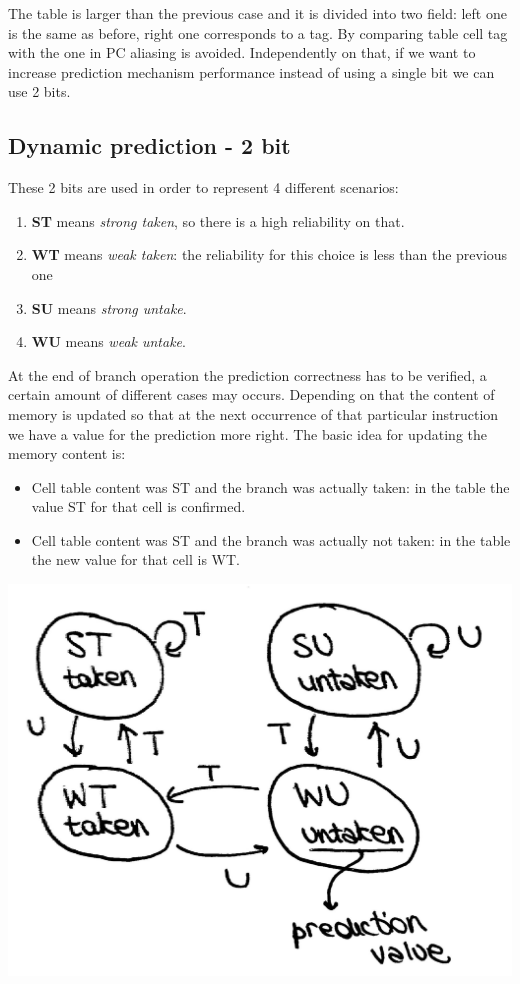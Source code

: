 The table is larger than the previous case and it is divided into two field:
left one is the same as before, right one corresponds to a tag. By comparing
table cell tag with the one in PC aliasing is avoided.
Independently on that, if we want to increase prediction mechanism performance
instead of using a single bit we can use 2 bits.


\subsection{Dynamic prediction - 2 bit}
These 2 bits are used in order to represent 4 different scenarios:

\begin{enumerate}
  \item \textbf{ST} means \textit{strong taken}, so there is a high reliability
    on that.
  \item \textbf{WT} means \textit{weak taken}: the reliability for this choice
    is less than the previous one
  \item \textbf{SU} means \textit{strong untake}.
  \item \textbf{WU} means \textit{weak untake}.
\end{enumerate}


At the end of branch operation the prediction correctness has to be verified, a
certain amount of different cases may occurs. Depending on that the content of
memory is updated so that at the next occurrence of that particular instruction
we have a value for the prediction more right. The basic idea for updating the
memory content is:
\begin{itemize}
  \item Cell table content was ST and the branch was actually taken: in the
    table the value ST for that cell is confirmed.
  \item Cell table content was ST and the branch was actually not taken: in
    the table the new value for that cell is WT.
\end{itemize}

\begin{center}
  \includegraphics[width=0.6\linewidth]{img/img3/17}
\end{center}

